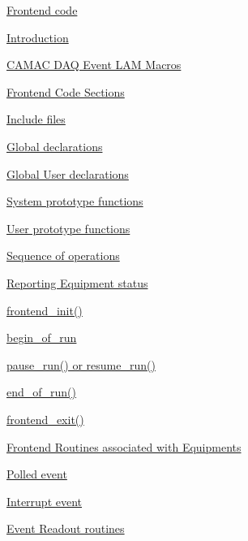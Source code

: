 \begin{TabularC}{2}
\begin{TabularC}{2}
\begin{DoxyItemize}
\item \hyperlink{Frontend_code}{Frontend code} 
\begin{DoxyItemize}
\item \hyperlink{Frontend_code_FE_intro}{Introduction} 
\begin{DoxyItemize}
\item \hyperlink{Frontend_code_FE_LAM_macros}{CAMAC DAQ Event LAM Macros} 
\end{DoxyItemize}
\item \hyperlink{FE_code_sections}{Frontend Code Sections} 
\begin{DoxyItemize}
\item \hyperlink{FE_code_sections_FE_includes}{Include files} 
\item \hyperlink{FE_code_sections_FE_global}{Global declarations} 
\item \hyperlink{FE_code_sections_FE_global_user}{Global User declarations} 
\item \hyperlink{FE_code_sections_FE_system_prototypes}{System prototype functions} 
\item \hyperlink{FE_code_sections_FE_user_prototypes}{User prototype functions} 
\end{DoxyItemize}
\item \hyperlink{FE_sequence}{Sequence of operations} 
\begin{DoxyItemize}
\item \hyperlink{FE_sequence_FE_frontend_status}{Reporting Equipment status} 
\item \hyperlink{FE_sequence_FE_frontend_init}{frontend\_\-init()} 
\item \hyperlink{FE_sequence_FE_begin_of_run}{begin\_\-of\_\-run} 
\item \hyperlink{FE_sequence_FE_pause_resume_run}{pause\_\-run() or resume\_\-run()} 
\item \hyperlink{FE_sequence_FE_end_of_run}{end\_\-of\_\-run()} 
\item \hyperlink{FE_sequence_FE_frontend_exit}{frontend\_\-exit()} 
\end{DoxyItemize}
\item \hyperlink{FE_eq_event_routines}{Frontend Routines associated with Equipments} 
\begin{DoxyItemize}
\item \hyperlink{FE_eq_event_routines_FE_poll_event}{Polled event} 
\item \hyperlink{FE_eq_event_routines_FE_interrupt_event}{Interrupt event} 
\item \hyperlink{FE_eq_event_routines_FE_readout_routine}{Event Readout routines} 

\end{DoxyItemize}
\end{DoxyItemize}
\end{DoxyItemize}
\end{TabularC}
\end{TabularC}
